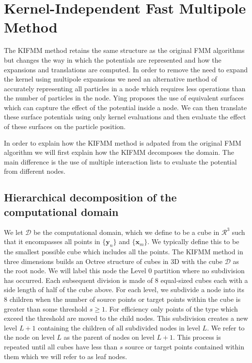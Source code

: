 \FloatBarrier
\section{Kernel-Independent Fast Multipole Method}\label{sec:KIFMM}
The KIFMM method retains the same structure as the original FMM algorithms but changes the way in which the potentials are represented and how the expansions and translations are computed. In order to remove the need to expand the kernel using multipole expansions we need an alternative method of accurately representing all particles in a node which requires less operations than the number of particles in the node. Ying \cite{Ying2004} proposes the use of equivalent surfaces which can capture the effect of the potential inside a node. We can then translate these surface potentials using only kernel evaluations and then evaluate the effect of these surfaces on the particle position.

In order to explain how the KIFMM method is adpated from the original FMM algorithm we will first explain how the KIFMM decomposes the domain. The main difference is the use of multiple interaction lists to evaluate the potential from different nodes. 

\subsection{Hierarchical decomposition of the computational domain}
We let $\mathcal{D}$ be the computational domain, which we define to be a cube in $\mathcal{R}^3$ such that it encompasses all points in $\{\bm{y}_n\}$ and $\{\bm{x}_m\}$. We typically define this to be the smallest possible cube which includes all the points. The KIFMM method in three dimensions builds an Octree structure of cubes in 3D with the cube $\mathcal{D}$ as the root node. We will label this node the Level $0$ partition where no subdivision has occurred. Each subsequent division is made of $8$ equal-sized cubes each with a side length of half of the cube above. For each level, we subdivide a node into its $8$ children when the number of source points or target points within the cube is greater than some threshold $s\geq 1$. For efficiency only points of the type which exceed the threshold are moved to the child nodes. This subdivision creates a new level $L+1$ containing the children of all subdivided nodes in level $L$. We refer to the node on level $L$ as the parent of nodes on level $L+1$. This process is repeated until all cubes have less than $s$ source or target points contained within them which we will refer to as leaf nodes.

